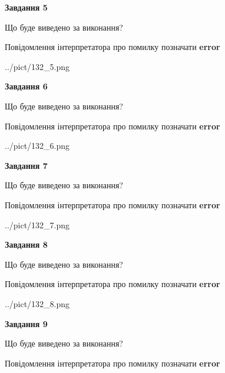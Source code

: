 \documentclass[11pt, ukrainian]{article}
\begin{document}
{\begin {large}
{\begin {center}\textbf{Завдання 5}\end {center}}\par
Що буде виведено за виконання? \par
Повідомлення інтерпретатора про помилку позначати \textbf{error}

\begin{center}
	{../pict/132_5.png}
\end{center}
\newpage

{\begin {center}\textbf{Завдання 6}\end {center}}\par
Що буде виведено за виконання? \par
Повідомлення інтерпретатора про помилку позначати \textbf{error}

\begin{center}
	{../pict/132_6.png}
\end{center}
\newpage

{\begin {center}\textbf{Завдання 7}\end {center}}\par
Що буде виведено за виконання? \par
Повідомлення інтерпретатора про помилку позначати \textbf{error}

\begin{center}
	{../pict/132_7.png}
\end{center}
\newpage

{\begin {center}\textbf{Завдання 8}\end {center}}\par
Що буде виведено за виконання? \par
Повідомлення інтерпретатора про помилку позначати \textbf{error}

\begin{center}
	{../pict/132_8.png}
\end{center}
\newpage

{\begin {center}\textbf{Завдання 9}\end {center}}\par
Що буде виведено за виконання? \par
Повідомлення інтерпретатора про помилку позначати \textbf{error}


\end{large}}
\end{document}
